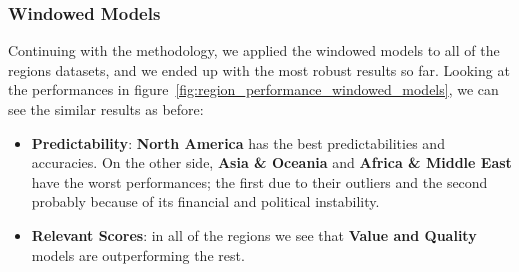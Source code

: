 \documentclass[11pt,english,a4paper,hidelinks]{book}
\begin{document}
\subsubsection{Windowed Models}
\noindent Continuing with the methodology, we applied the windowed models to all of the regions datasets, and we ended up with the most robust results so far. Looking at the performances in figure~\ref{fig:region_performance_windowed_models}, we can see the similar results as before:  

\begin{itemize}
    \item \textbf{Predictability}: \textbf{North America} has the best predictabilities and accuracies. On the other side,  \textbf{Asia \& Oceania} and \textbf{Africa \& Middle East} have the worst performances; the first due to their outliers and the second probably because of its financial and political instability.
    \item \textbf{Relevant Scores}: in all of the regions we see that \textbf{Value and Quality} models are outperforming the rest.
\end{itemize}
\end{document}
